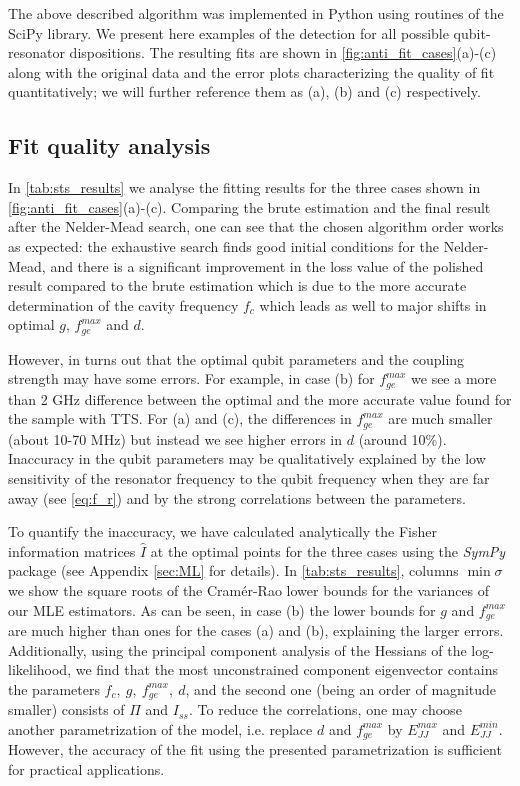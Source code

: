 \documentclass[%
 aip,
 amsmath,amssymb,
 reprint,%
]{revtex4-1}
\begin{document}
The above described algorithm was implemented in Python using  routines of the SciPy\cite{scipy} library. We present here examples of the detection for all possible qubit-resonator dispositions.  The resulting fits are shown in \autoref{fig:anti_fit_cases}(a)-(c) along with the original data and the error plots characterizing the quality of fit quantitatively; we will further reference them as (a), (b) and (c) respectively.

\subsection{Fit quality analysis} 

In \autoref{tab:sts_results} we analyse the fitting results for the three cases shown in \autoref{fig:anti_fit_cases}(a)-(c). Comparing the brute estimation and the final result after the Nelder-Mead search, one can see that the chosen algorithm order works as expected: the exhaustive search finds good initial conditions for the Nelder-Mead, and there is a significant improvement in the loss value of the polished result compared to the brute estimation which is due to the more accurate determination of the cavity frequency $f_c$ which leads as well to major shifts in optimal $g$, $f_{ge}^{max}$ and $d$.

However, in turns out that the optimal qubit parameters and the coupling strength may have some errors. For example, in case (b) for $f_{ge}^{max}$ we see a more than 2 GHz difference between the optimal and the more accurate value found for the sample with TTS. For (a) and (c), the differences in $f_{ge}^{max}$ are much smaller (about 10-70 MHz) but instead we see higher errors in $d$ (around 10\%). Inaccuracy in the qubit parameters may be qualitatively explained by the low sensitivity of the resonator frequency to the qubit frequency when they are far away (see \eqref{eq:f_r}) and by the strong correlations between the parameters.

To quantify the inaccuracy, we have calculated analytically the Fisher information matrices $\hat I$ at the optimal points for the three cases using the \textit{SymPy}\cite{sympy} package (see Appendix \ref{sec:ML} for details). In \autoref{tab:sts_results}, columns $\min \sigma$ we show the square roots of the Cramér-Rao lower bounds for the variances of our MLE estimators. As can be seen, in case (b) the lower bounds for $g$ and $f_{ge}^{max}$ are much higher than ones for the cases (a) and (b), explaining the larger errors. Additionally, using the principal component analysis of the Hessians of the log-likelihood, we find that the most unconstrained component eigenvector contains the parameters $f_c,\ g,\ f_{ge}^{max},\ d$, and the second one (being an order of magnitude smaller) consists of $\Pi$ and $I_{ss}$. To reduce the correlations, one may choose another parametrization of the model, i.e. replace $d$ and $f_{ge}^{max}$ by $ E_{JJ}^{max} $ and $ E_{JJ}^{min} $. However, the accuracy of the fit using the presented parametrization is sufficient for practical applications.
\end{document}
